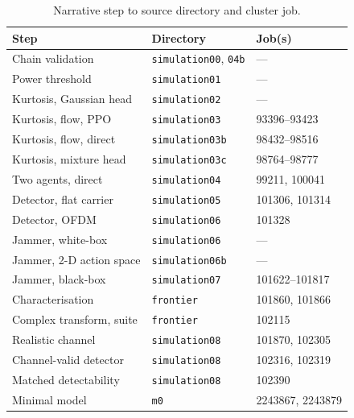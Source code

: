\begin{table}[!t]
\renewcommand{\arraystretch}{1.3}
\caption{Narrative step to source directory and cluster job.}
\label{tab:traceability}
\centering
\begin{tabular}{l l l}
\hline\hline
\textbf{Step} & \textbf{Directory} & \textbf{Job(s)} \\
\hline
Chain validation          & \texttt{simulation00}, \texttt{04b} & --- \\
Power threshold           & \texttt{simulation01}  & --- \\
Kurtosis, Gaussian head   & \texttt{simulation02}  & --- \\
Kurtosis, flow, PPO       & \texttt{simulation03}  & 93396--93423 \\
Kurtosis, flow, direct    & \texttt{simulation03b} & 98432--98516 \\
Kurtosis, mixture head    & \texttt{simulation03c} & 98764--98777 \\
Two agents, direct        & \texttt{simulation04}  & 99211, 100041 \\
Detector, flat carrier    & \texttt{simulation05}  & 101306, 101314 \\
Detector, OFDM            & \texttt{simulation06}  & 101328 \\
Jammer, white-box         & \texttt{simulation06}  & --- \\
Jammer, 2-D action space  & \texttt{simulation06b} & --- \\
Jammer, black-box         & \texttt{simulation07}  & 101622--101817 \\
Characterisation          & \texttt{frontier}      & 101860, 101866 \\
Complex transform, suite  & \texttt{frontier}      & 102115 \\
Realistic channel         & \texttt{simulation08}  & 101870, 102305 \\
Channel-valid detector    & \texttt{simulation08}  & 102316, 102319 \\
Matched detectability     & \texttt{simulation08}  & 102390 \\
Minimal model             & \texttt{m0}            & 2243867, 2243879 \\
\hline\hline
\end{tabular}
\end{table}
